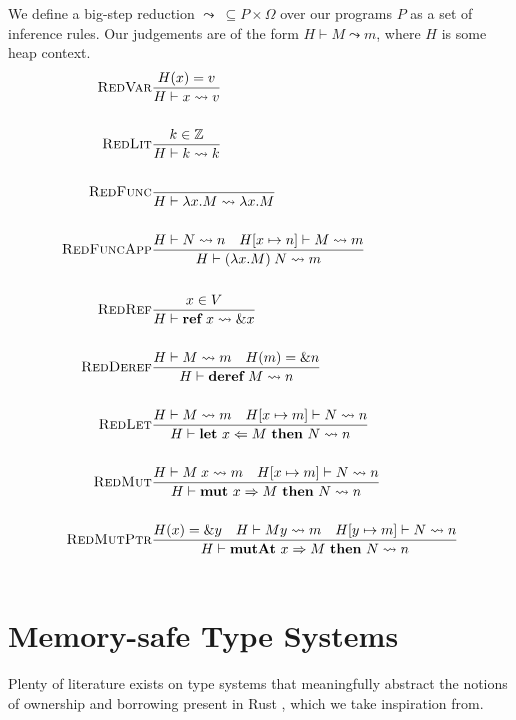 \documentclass{article}
\newcommand{\agap}{\hspace{0.25em}}
\newcommand{\mkref}{\textbf{ref}~}
\newcommand{\deref}{\textbf{deref}~}%
\newcommand{\mutate}[3]{\textbf{mut}~ #1 \Rightarrow #2 ~\textbf{then}~ #3}
\newcommand{\mutptr}[3]{\textbf{mutAt}~ #1 \Rightarrow #2 ~\textbf{then}~ #3}
\newcommand{\letvar}[3]{\textbf{let}~ #1 \Leftarrow #2 ~\textbf{then}~ #3}
\newcommand{\red}{\leadsto}
\newcommand{\judge}[3]{\textsc{#1}&\frac{#2}{#3}}
\begin{document}
We define a big-step reduction $\red ~\subseteq P \times \Omega$ over our programs $P$ as a set of inference rules. Our judgements are of the form $H \vdash M \red m$, where $H$ is some heap context. 
\begin{align*}
    \judge{RedVar}{H(x) = v}{H \vdash x \red v }\\
    ~\\
    \judge{RedLit}{k \in \mathbb{Z} }{H \vdash k \red k}\\
    ~\\
    \judge{RedFunc}{}{H \vdash \lambda x . M \red \lambda x . M}\\
    ~\\
    \judge{RedFuncApp}{H \vdash N \red n \hspace{1em} H[x \mapsto n] \vdash M \red m }{H \vdash (\lambda x . M) \agap N \red m}\\
    ~\\
    \judge{RedRef}{x \in V}{H \vdash \mkref x \red \&x}\\
    ~\\
    \judge{RedDeref}{H \vdash M \red m \hspace{1em} H(m) = \& n }{ H \vdash \deref M \red n }\\
    ~\\
    \judge{RedLet}{H \vdash M \red m \hspace{1em} H[x \mapsto m] \vdash N \red n }{ H \vdash \letvar{x}{M}{N} \red n }\\
    ~\\
    \judge{RedMut}{H \vdash M \agap x \red m \hspace{1em} H [x \mapsto m] \vdash N \red n }{ H \vdash \mutate{x}{M}{N} \red n }\\
    ~\\
    \judge{RedMutPtr}{ H(x) = \&y \hspace{1em} H \vdash M y \red m \hspace{1em}  H [y \mapsto m] \vdash N \red n }{ H \vdash \mutptr{x}{M}{N} \red n }\\
    ~\\
\end{align*}

\section{Memory-safe Type Systems}

Plenty of literature exists on type systems that meaningfully abstract the notions of ownership and borrowing present in Rust \cite{marshall2022entente, marshall2024fracunique}, which we take inspiration from. 
\end{document}
